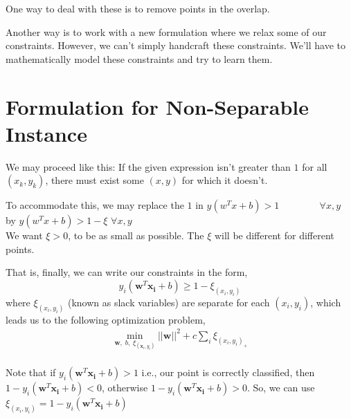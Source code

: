 \documentclass[12pt]{article}
\begin{document}
    
    One way to deal with these is to remove points in the overlap. 
    
    \vspace{3pt}
    
    Another way is to work with a new formulation where we relax some of our constraints. However, we can't simply handcraft these constraints. We'll have to mathematically model these constraints and try to learn them. 

    
    

\section{Formulation for Non-Separable Instance}


    We may proceed like this: If the given expression isn't greater than $1$ for all $(x_k,y_k)$, there must exist some $(x,y)$ for which it doesn't. 
    
    To accommodate this, we may replace the $1$ in  \hspace{15pt} $y(w^{T}x+b) > 1 \hspace{50pt} \forall x,y$\\
    by  \hspace{225pt} $y(w^{T}x+b) > 1-\xi$ \hspace{23pt}  $\forall x,y$\\
    We want $\xi > 0$, to be as small as possible. The $\xi$ will be different for different points.
    
    
    \vspace{10pt}
    
    That is, finally, we can write our constraints in the form,
    \[
         y_i(\boldsymbol{w}^T\boldsymbol{x_i}+b) \geq 1-{\xi}_{(x_i, y_i)}
    \]
    where ${\xi}_{(x_i, y_i)}$ (known as slack variables) are separate for each $(x_i, y_i)$, which leads us to the following optimization problem,
    \begin{gather*}
        \displaystyle \min_{\boldsymbol{w},\; b,\; \xi_{( \boldsymbol{x}_i, y_i)}}{||\boldsymbol{w}||^2+c\sum_{i}{\xi}_{(x_i, y_i)_+}}
     \end{gather*}
    \\
    Note that if $y_i(\boldsymbol{w}^T\boldsymbol{x_i}+b) > 1$ i.e., our point is correctly classified, then $1-y_i(\boldsymbol{w}^T\boldsymbol{x_i}+b) < 0$, otherwise $1-y_i(\boldsymbol{w}^T\boldsymbol{x_i}+b) > 0$. So, we can use ${\xi}_{(x_i, y_i)} = 1-y_i(\boldsymbol{w}^T\boldsymbol{x_i}+b)$ 
    
\end{document}
